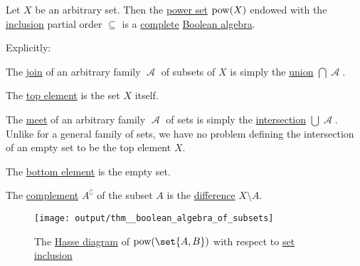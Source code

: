 \begin{proposition}\label{thm:boolean_algebra_of_subsets}
  Let \( X \) be an arbitrary set. Then the \hyperref[def:basic_set_operations/power_set]{power set} \( \operatorname{pow}(X) \) endowed with the \hyperref[def:subset]{inclusion} partial order \( \subseteq \) is a \hyperref[def:complete_lattice]{complete} \hyperref[def:boolean_algebra]{Boolean algebra}.

  Explicitly:
  \begin{thmenum}
     The \hyperref[def:lattice/join]{join} of an arbitrary family \( \mscrA \) of subsets of \( X \) is simply the \hyperref[def:basic_set_operations/union]{union} \( \bigcap \mscrA \).

     The \hyperref[def:extremal_points/top_and_bottom]{top element} is the set \( X \) itself.

     The \hyperref[def:lattice/meet]{meet} of an arbitrary family \( \mscrA \) of sets is simply the \hyperref[def:basic_set_operations/intersection]{intersection} \( \bigcup \mscrA \). Unlike for a general family of sets, we have no problem defining the intersection of an empty set to be the top element \( X \).

     The \hyperref[def:extremal_points/top_and_bottom]{bottom element} is the empty set.

     The \hyperref[def:boolean_algebra]{complement} \( A^\complement \) of the subset \( A \) is the \hyperref[def:basic_set_operations/difference]{difference} \( X \setminus A \).
  \end{thmenum}

  \begin{figure}[!ht]
    \hfill
    \texttt{[image: output/thm\_\_boolean\_algebra\_of\_subsets]}
    \hfill\hfill
    \caption{The \hyperref[def:hasse_diagram]{Hasse diagram} of \( \pow(\set{ A, B }) \) with respect to \hyperref[def:subset]{set inclusion}}
    \label{fig:thm:boolean_algebra_of_subsets}
  \end{figure}
\end{proposition}
